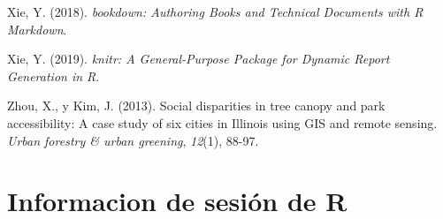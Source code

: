 \documentclass[12pt,a4paper,oneside, openany]{book}
\theoremstyle{definition}
\theoremstyle{definition}
\theoremstyle{definition}
\theoremstyle{remark}
\begin{document}
\hypertarget{ref-R-bookdown}{}
Xie, Y. (2018). \emph{bookdown: Authoring Books and Technical Documents
with R Markdown}.

\hypertarget{ref-R-knitr}{}
Xie, Y. (2019). \emph{knitr: A General-Purpose Package for Dynamic
Report Generation in R}.

\hypertarget{ref-zhou_social_2013}{}
Zhou, X., y Kim, J. (2013). Social disparities in tree canopy and park
accessibility: A case study of six cities in Illinois using GIS and
remote sensing. \emph{Urban forestry \& urban greening}, \emph{12}(1),
88-97.

\appendix


\chapter{Informacion de sesión de R}\label{rinfo}
\end{document}
